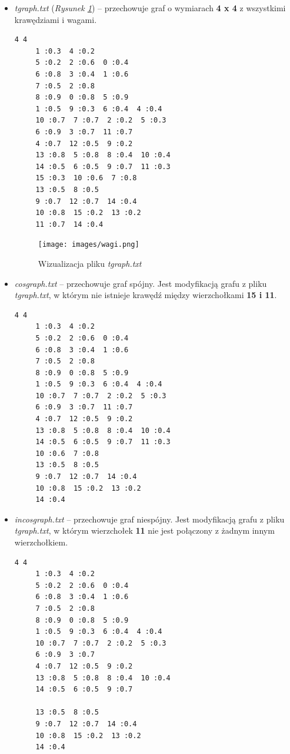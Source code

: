 \documentclass{article}
\begin{document}
\begin{itemize}
    \item \emph{t\textunderscore graph.txt} (\emph{Rysunek \ref{fig:wagi}}) -- przechowuje graf o wymiarach \textbf{4 x 4} z wszystkimi krawędziami i wagami.
\begin{lstlisting}
4 4
	 1 :0.3  4 :0.2 
	 5 :0.2  2 :0.6  0 :0.4 
	 6 :0.8  3 :0.4  1 :0.6
	 7 :0.5  2 :0.8 
	 8 :0.9  0 :0.8  5 :0.9 
	 1 :0.5  9 :0.3  6 :0.4  4 :0.4 
	 10 :0.7  7 :0.7  2 :0.2  5 :0.3 
	 6 :0.9  3 :0.7  11 :0.7 
	 4 :0.7  12 :0.5  9 :0.2 
	 13 :0.8  5 :0.8  8 :0.4  10 :0.4 
	 14 :0.5  6 :0.5  9 :0.7  11 :0.3 
	 15 :0.3  10 :0.6  7 :0.8 
	 13 :0.5  8 :0.5 
	 9 :0.7  12 :0.7  14 :0.4 
	 10 :0.8  15 :0.2  13 :0.2 
	 11 :0.7  14 :0.4 
\end{lstlisting}
\begin{figure}[htp]
    \centering
    \texttt{[image: images/wagi.png]}
    \caption{Wizualizacja pliku \emph{t\textunderscore graph.txt}}
    \label{fig:wagi}
\end{figure}
\item \emph{cos\textunderscore graph.txt} -- przechowuje graf spójny. Jest modyfikacją grafu z pliku \emph{t\textunderscore graph.txt}, w którym nie istnieje krawędź między wierzchołkami \textbf{15 i 11}.
\begin{lstlisting}
4 4
	 1 :0.3  4 :0.2 
	 5 :0.2  2 :0.6  0 :0.4 
	 6 :0.8  3 :0.4  1 :0.6
	 7 :0.5  2 :0.8 
	 8 :0.9  0 :0.8  5 :0.9 
	 1 :0.5  9 :0.3  6 :0.4  4 :0.4 
	 10 :0.7  7 :0.7  2 :0.2  5 :0.3 
	 6 :0.9  3 :0.7  11 :0.7 
	 4 :0.7  12 :0.5  9 :0.2 
	 13 :0.8  5 :0.8  8 :0.4  10 :0.4 
	 14 :0.5  6 :0.5  9 :0.7  11 :0.3 
	 10 :0.6  7 :0.8 
	 13 :0.5  8 :0.5 
	 9 :0.7  12 :0.7  14 :0.4 
	 10 :0.8  15 :0.2  13 :0.2 
	 14 :0.4 
\end{lstlisting}
\item \emph{incos\textunderscore graph.txt} -- przechowuje graf niespójny. Jest modyfikacją grafu z pliku \emph{t\textunderscore graph.txt}, w którym wierzchołek \textbf{11} nie jest połączony z żadnym innym wierzchołkiem.
\begin{lstlisting}
4 4
	 1 :0.3  4 :0.2 
	 5 :0.2  2 :0.6  0 :0.4 
	 6 :0.8  3 :0.4  1 :0.6
	 7 :0.5  2 :0.8 
	 8 :0.9  0 :0.8  5 :0.9 
	 1 :0.5  9 :0.3  6 :0.4  4 :0.4 
	 10 :0.7  7 :0.7  2 :0.2  5 :0.3 
	 6 :0.9  3 :0.7  
	 4 :0.7  12 :0.5  9 :0.2 
	 13 :0.8  5 :0.8  8 :0.4  10 :0.4 
	 14 :0.5  6 :0.5  9 :0.7   
	  
	 13 :0.5  8 :0.5 
	 9 :0.7  12 :0.7  14 :0.4 
	 10 :0.8  15 :0.2  13 :0.2 
	 14 :0.4 
\end{lstlisting}


\end{itemize}
\end{document}
